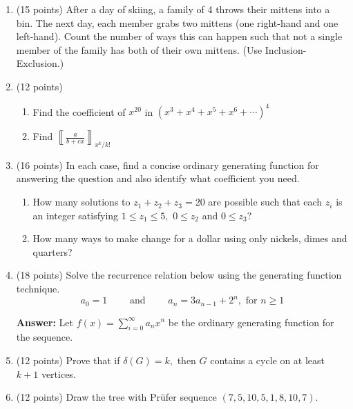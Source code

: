 \documentclass[11pt]{article}
\def\ldb{\llbracket}
\def\rdb{\rrbracket}
\begin{document}
\newpage
\vspace*{-0.3in}
\begin{enumerate}
\item (15 points) After a day of skiing, a family of 4 throws their mittens into a bin. The next day, each member grabs two mittens (one right-hand and one left-hand). Count the number of ways this can happen such that not a single member of the family has both of their own mittens. (Use Inclusion-Exclusion.)\\

\item (12 points) 
	\begin{enumerate}
	\item Find the coefficient of $x^{20}$ in $(x^3+x^4+x^5+x^6+ \cdots)^4$\\
	\vfill
	\item Find $\displaystyle{\left\ldb \frac{a}{b+cx}\right \rdb_{x^k/k!}}$
	\vfill
	\end{enumerate}
\item (16 points) In each case, find a concise ordinary generating function for answering the question and also identify what coefficient you need.
	\begin{enumerate}
	\item How many solutions to $z_1+z_2+z_3=20$ are possible such that each $z_i$ is an integer satisfying $1 \leq z_1 \leq 5,$ $0 \leq z_2$ and $0 \leq z_3$?
	\vfill
	\item How many ways to make change for a dollar using only nickels, dimes and quarters?
	\vfill
	\end{enumerate}
\item (18 points) Solve the recurrence relation below using the generating function technique.\\
$$ a_0=1 \quad \quad \text{  and  } \quad \quad a_n=3a_{n-1}+2^n, \text{  for  } n \geq 1$$

\textbf{Answer:} Let $\displaystyle{f(x)=\sum_{i=0}^\infty a_nx^n}$ be the ordinary generating function for the sequence. \\

\vfill
\item (12 points) Prove that if $\delta(G)=k,$ then $G$ contains a cycle on at least $k+1$ vertices.\\

\vfill

\item (12 points) Draw the tree with Pr\"{u}fer sequence $(7,5,10,5,1,8,10,7).$


\end{enumerate}
\end{document}
